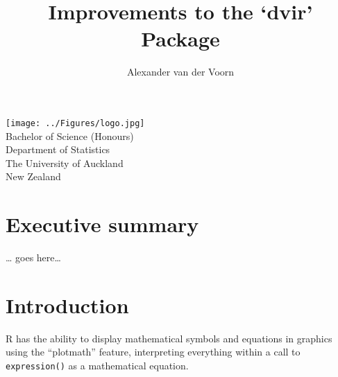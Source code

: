 \documentclass[]{article}
\title{Improvements to the `dvir' Package}
\author{Alexander van der Voorn}
\date{}
\newenvironment{Shaded}{\begin{snugshade}}{\end{snugshade}}
\newcommand{\KeywordTok}[1]{\textcolor[rgb]{0.13,0.29,0.53}{\textbf{#1}}}
\newcommand{\DataTypeTok}[1]{\textcolor[rgb]{0.13,0.29,0.53}{#1}}
\newcommand{\DecValTok}[1]{\textcolor[rgb]{0.00,0.00,0.81}{#1}}
\newcommand{\StringTok}[1]{\textcolor[rgb]{0.31,0.60,0.02}{#1}}
\newcommand{\OperatorTok}[1]{\textcolor[rgb]{0.81,0.36,0.00}{\textbf{#1}}}
\newcommand{\NormalTok}[1]{#1}
\begin{document}
\maketitle

\newcommand*\Tikz{\textup{Ti\textit kZ}}

\begin{center}

\vspace{8cm}
\texttt{[image: ../Figures/logo.jpg]}\\
\vspace{1cm}
Bachelor of Science (Honours)\\
Department of Statistics\\
The University of Auckland\\
New Zealand

\end{center}

\newpage

\tableofcontents

\newpage{}

\section{Executive summary}\label{executive-summary}

\ldots{} goes here\ldots{}

\newpage{}

\section{Introduction}\label{introduction}

R has the ability to display mathematical symbols and equations in
graphics using the ``plotmath'' feature, interpreting everything within
a call to \texttt{expression()} as a mathematical equation.

\begin{Shaded}
\end{Shaded}
\end{document}
